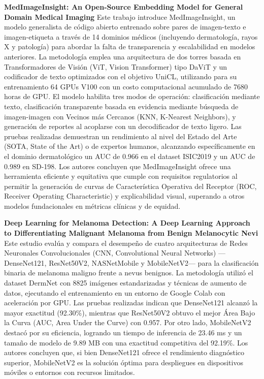 \documentclass[11pt, a4paper]{article}
\begin{document}
\textbf{MedImageInsight: An Open-Source Embedding Model for General Domain Medical Imaging} \cite{codella_medimageinsight_2024}
Este trabajo introduce MedImageInsight, un modelo generalista de código abierto entrenado sobre pares de imagen-texto e imagen-etiqueta a través de 14 dominios médicos (incluyendo dermatología, rayos X y patología) para abordar la falta de
transparencia y escalabilidad en modelos anteriores. La metodología emplea una arquitectura de dos torres basada en Transformadores de Visión (ViT, Vision Transformer) tipo DaViT y un codificador de texto optimizados con el objetivo UniCL,
utilizando para su entrenamiento 64 GPUs V100 con un costo computacional acumulado de 7680 horas de GPU. El modelo habilita tres modos de operación: clasificación mediante texto, clasificación transparente basada en evidencia mediante búsqueda
de imagen-imagen con Vecinos más Cercanos (KNN, K-Nearest Neighbors), y generación de reportes al acoplarse con un decodificador de texto ligero. Las pruebas realizadas demuestran un rendimiento al nivel del Estado del Arte 
(SOTA, State of the Art) o de expertos humanos, alcanzando específicamente en el dominio dermatológico un AUC de 0.966 en el dataset ISIC2019 y un AUC de 0.989 en SD-198. Los autores concluyen que MedImageInsight ofrece una herramienta eficiente
y equitativa que cumple con requisitos regulatorios al permitir la generación de curvas de Característica Operativa del Receptor (ROC, Receiver Operating Characteristic) y explicabilidad visual, superando a otros modelos fundacionales en métricas
clínicas y de equidad.

\textbf{Deep Learning for Melanoma Detection: A Deep Learning Approach to Differentiating Malignant Melanoma from Benign Melanocytic Nevi} \cite{kreouzi_deep_2024}
Este estudio evalúa y compara el desempeño de cuatro arquitecturas de Redes Neuronales Convolucionales (CNN, Convolutional Neural Networks) —DenseNet121, ResNet50V2, NASNetMobile y MobileNetV2— para la clasificación binaria de melanoma maligno
frente a nevus benignos. La metodología utilizó el dataset DermNet con 8825 imágenes estandarizadas y técnicas de aumento de datos, ejecutando el entrenamiento en un entorno de Google Colab con aceleración por GPU. Las pruebas realizadas indican
que DenseNet121 alcanzó la mayor exactitud (92.30\%), mientras que ResNet50V2 obtuvo el mejor Área Bajo la Curva (AUC, Area Under the Curve) con 0.957. Por otro lado, MobileNetV2 destacó por su eficiencia, logrando un tiempo de inferencia de
23.46 ms y un tamaño de modelo de 9.89 MB con una exactitud competitiva del 92.19\%. Los autores concluyen que, si bien DenseNet121 ofrece el rendimiento diagnóstico superior, MobileNetV2 es la solución óptima para despliegues en dispositivos
móviles o entornos con recursos limitados.
\end{document}
